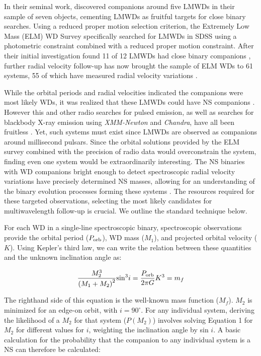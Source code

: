 \documentclass[letterpaper,12pt,preprint]{aastex}
\begin{document}
In their seminal work, \citet{marsh95} discovered companions around five LMWDs in their sample of seven objects, cementing LMWDs as fruitful targets for close binary searches. Using a reduced proper motion selection criterion, the Extremely Low Mass (ELM) WD Survey specifically searched for LMWDs in SDSS using a photometric constraint combined with a reduced proper motion constraint. After their initial investigation found 11 of 12 LMWDs had close binary companions \citep{ELMI}, further radial velocity follow-up has now brought the sample of ELM WDs to 61 systems, 55 of which have measured radial velocity variations \citep{ELMII, ELMIII, ELMIV, ELMV}.


While the orbital periods and radial velocities indicated the companions were most likely WDs, it was realized that these LMWDs could have NS companions \citep{vLeeuwen07}. However this and other radio searches for pulsed emission, as well as searches for blackbody X-ray emission using {\it XMM-Newton} and {\it Chandra}, have all been fruitless \citet{agueros09a,agueros09b,kilic13}. Yet, such systems must exist since LMWDs are observed as companions around millisecond pulsars. Since the orbital solutions provided by the ELM survey combined with the precision of radio data would overconstrain the system, finding even one system would be extraordinarily interesting. The NS binaries with WD companions bright enough to detect spectroscopic radial velocity variations have precisely determined NS masses, allowing for an understanding of the binary evolution processes forming these systems \citep{vKerkwijk96,callanan98,bassa06,antoniadis12}. The resources required for these targeted observations, selecting the most likely candidates for multiwavelength follow-up is crucial. We outline the standard technique below.


For each WD in a single-line spectroscopic binary, spectroscopic observations provide the orbital period ($P_{\rm orb}$), WD mass ($M_1$), and projected orbital velocity ($K$). Using Kepler's third law, we can write the relation between these quantities and the unknown inclination angle as:

\begin{equation}
	\frac{M_2^3}{\left(M_1+M_2\right)^2} {\rm sin}^3 i = \frac{P_{\rm orb}}{2\pi G} K^3 = m_f \label{eq:massfunc}
\end{equation}

The righthand side of this equation is the well-known mass function ($M_f$). $M_2$ is minimized for an edge-on orbit, with $i = 90^{\circ}$. For any individual system, deriving the likelihood of a $M_2$ for that system ($P(M_2)$) involves solving Equation 1 for $M_2$ for different values for $i$, weighting the inclination angle by sin $i$. A basic calculation for the probability that the companion to any individual system is a NS can therefore be calculated:
\end{document}
